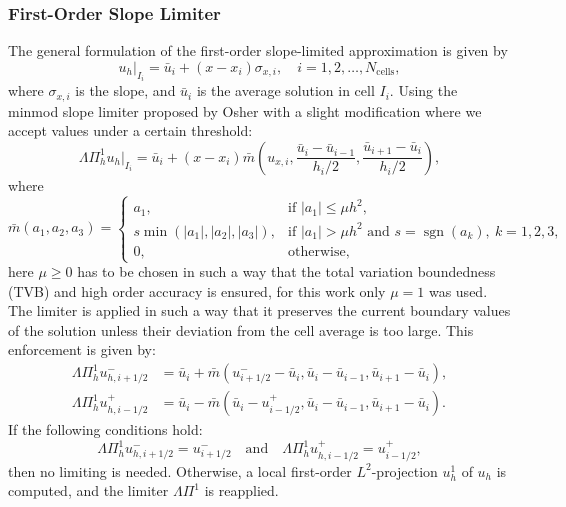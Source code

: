\documentclass[a4paper,12pt]{paper}
\begin{document}
\subsubsection{First-Order Slope Limiter}
The general formulation of the first-order slope-limited approximation is given by
\begin{equation*}
	u_h|_{I_i} = \bar{u}_i + (x - x_i) \sigma_{x,i}, \quad i = 1, 2, \ldots, N_{\text{cells}},
\end{equation*}
where $\sigma_{x,i}$ is the slope, and $\bar{u}_i$ is the average solution in cell $I_i$. Using the minmod slope limiter proposed by Osher \cite{OsherLimiter} with a slight modification where we accept values under a certain threshold:
\begin{equation*}
	\Lambda \Pi^1_h u_h |_{I_i} = \bar{u}_i + (x - x_i) \bar{m} \left( u_{x,i}, \frac{\bar{u}_i - \bar{u}_{i-1}}{h_i/2}, \frac{\bar{u}_{i+1} - \bar{u}_i}{h_i/2} \right),
\end{equation*}
where
\begin{equation*}
	\bar{m}(a_1, a_2, a_3) = 
	\begin{cases}
		a_1, & \text{if } |a_1| \leq \mu h^2, \\
		s \min(|a_1|, |a_2|, |a_3|), & \text{if } |a_1| > \mu h^2 \text{ and } s = \operatorname{sgn}(a_k),\ k = 1,2,3, \\
		0, & \text{otherwise},
	\end{cases}
\end{equation*}
here $\mu\geq 0$ has to be chosen in such a way that the total variation boundedness (TVB) and high order accuracy is ensured, for this work only $\mu=1$ was used.
The limiter is applied in such a way that it preserves the current boundary values of the solution unless their deviation from the cell average is too large. This enforcement is given by:
\begin{equation*}
	\begin{aligned}
		\Lambda \Pi^1_h u_{h, i+1/2}^{-} &= \bar{u}_i + \bar{m}(u_{i+1/2}^{-} - \bar{u}_i, \bar{u}_i - \bar{u}_{i-1}, \bar{u}_{i+1} - \bar{u}_i), \\
		\Lambda \Pi^1_h u_{h, i-1/2}^{+} &= \bar{u}_i - \bar{m}(\bar{u}_i - u_{i-1/2}^{+}, \bar{u}_i - \bar{u}_{i-1}, \bar{u}_{i+1} - \bar{u}_i).
	\end{aligned}
\end{equation*}
If the following conditions hold:
\[
\Lambda \Pi^1_h u_{h, i+1/2}^{-} = u_{i+1/2}^{-} \quad \text{and} \quad \Lambda \Pi^1_h u_{h, i-1/2}^{+} = u_{i-1/2}^{+},
\]
then no limiting is needed. Otherwise, a local first-order $L^2$-projection $u_h^1$ of $u_h$ is computed, and the limiter $\Lambda \Pi^1$ is reapplied.
\end{document}
